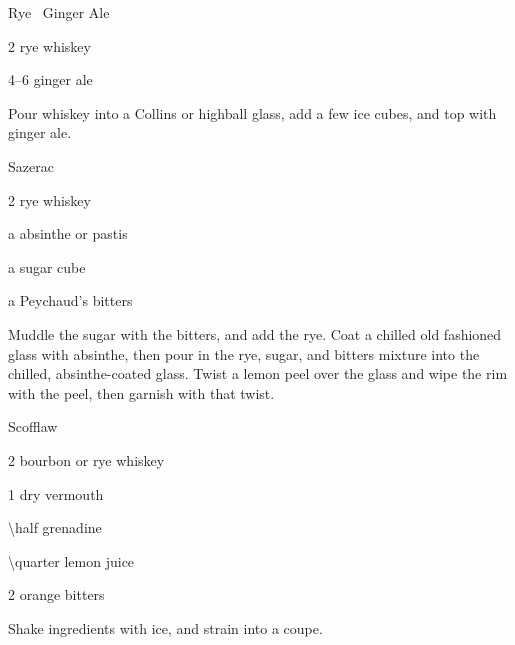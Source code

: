 \begin{Cocktail}{Rye \And\ Ginger Ale}
  \begin{Ingredients}
  \item \SI{2}{\oz} rye whiskey
  \item \SIrange{4}{6}{\oz} ginger ale
  \end{Ingredients}
  
  \begin{Instructions}
	Pour whiskey into a Collins or highball glass, add a few ice cubes, and top with ginger ale.
  \end{Instructions}
\end{Cocktail}

\begin{Cocktail}{Sazerac}
  \begin{Ingredients}
  \item \SI{2}{\oz} rye whiskey
  \item a \si{\splash} absinthe or pastis
  \item a sugar cube
  \item a \si{\dash} Peychaud's bitters
  \end{Ingredients}
  
  \begin{Instructions}
	Muddle the sugar with the bitters, and add the rye.  Coat a chilled old fashioned glass with absinthe, then pour in the rye, sugar, and bitters mixture into the chilled, absinthe-coated glass.  Twist a lemon peel over the glass and wipe the rim with the peel, then garnish with that twist.
  \end{Instructions}
\end{Cocktail}

\begin{Cocktail}{Scofflaw}
  \begin{Ingredients}
  \item \SI{2}{\oz} bourbon or rye whiskey
  \item \SI{1}{\oz} dry vermouth
  \item \SI{\half}{\oz} grenadine
  \item \SI{\quarter}{\oz} lemon juice
  \item 2 \si{\dashes} orange bitters
  \end{Ingredients}
  
  \begin{Instructions}
	Shake ingredients with ice, and strain into a coupe.
  \end{Instructions}
\end{Cocktail}

